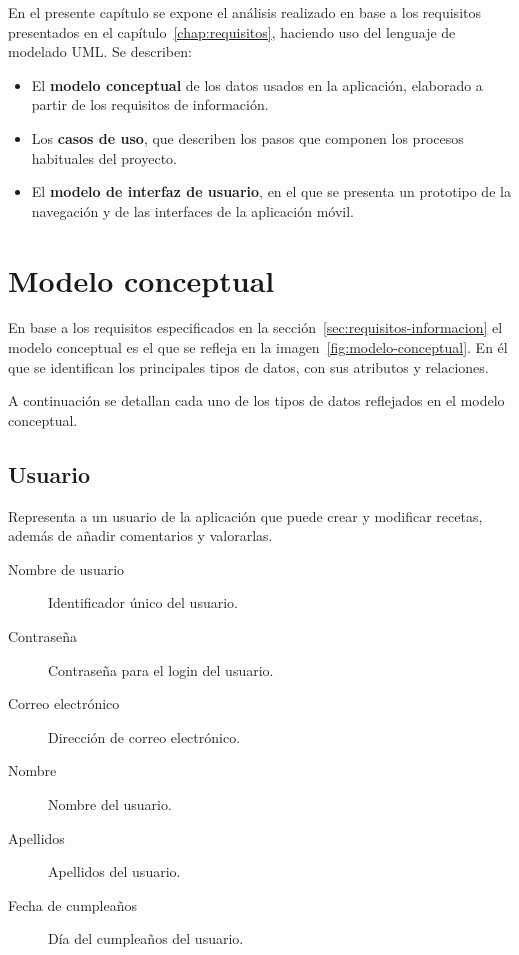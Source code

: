 En el presente capítulo se expone el análisis realizado en base a los requisitos
presentados en el capítulo~\ref{chap:requisitos}, haciendo uso del lenguaje de
modelado UML. Se describen:

\begin{itemize}
\item El \textbf{modelo conceptual} de los datos usados en la aplicación,
  elaborado a partir de los requisitos de información.
\item Los \textbf{casos de uso}, que describen los pasos que componen los
  procesos habituales del proyecto.
\item El \textbf{modelo de interfaz de usuario}, en el que se presenta un
  prototipo de la navegación y de las interfaces de la aplicación móvil.
\end{itemize}

\section{Modelo conceptual}

En base a los requisitos especificados en la
sección~\ref{sec:requisitos-informacion} el modelo conceptual es el que se
refleja en la imagen~\ref{fig:modelo-conceptual}. En él que se identifican los
principales tipos de datos, con sus atributos y relaciones.

A continuación se detallan cada uno de los tipos de datos reflejados en el
modelo conceptual.


\subsection{Usuario}

Representa a un usuario de la aplicación que puede crear y modificar recetas,
además de añadir comentarios y valorarlas.

\begin{description}
\item[Nombre de usuario] Identificador único del usuario.
\item[Contraseña] Contraseña para el login del usuario.
\item[Correo electrónico] Dirección de correo electrónico.
\item[Nombre] Nombre del usuario.
\item[Apellidos] Apellidos del usuario.
\item[Fecha de cumpleaños] Día del cumpleaños del usuario.
\end{description}


